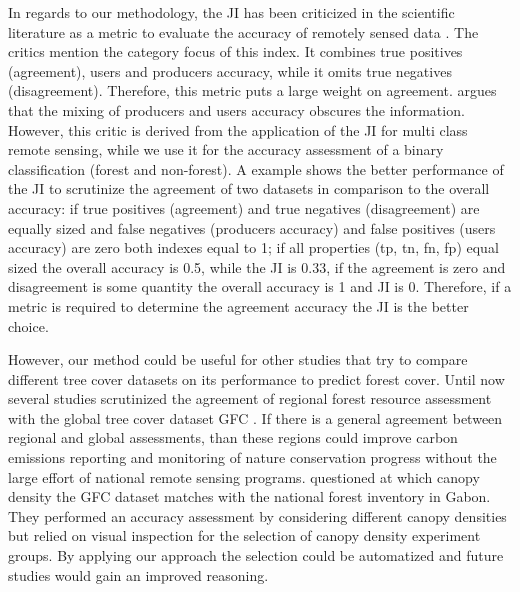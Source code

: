 		In regards to our methodology, the \ac{JI} has been criticized in the scientific literature as a metric to evaluate the accuracy of remotely sensed data \citep{Li2017a}. The critics mention the category focus of this index. It combines true positives (agreement), users and producers accuracy, while it omits true negatives (disagreement). Therefore, this metric puts a large weight on agreement. \citet{Li2017a} argues that the mixing of producers and users accuracy obscures the information. However, this critic is derived from the application of the \ac{JI} for multi class remote sensing, while we use it for the accuracy assessment of a binary classification (forest and non-forest). A example shows the better performance of the \ac{JI} to scrutinize the agreement of two datasets in comparison to the overall accuracy: if true positives (agreement) and true negatives (disagreement) are equally sized and false negatives (producers accuracy) and false positives (users accuracy) are zero both indexes equal to 1; if all properties (tp, tn, fn, fp) equal sized the overall accuracy is 0.5, while the \ac{JI} is 0.33, if the agreement is zero and disagreement is some quantity the overall accuracy is 1 and \ac{JI} is 0. Therefore, if a metric is required to determine the agreement accuracy the \ac{JI} is the better choice. 

		However, our method could be useful for other studies that try to compare different tree cover datasets on its performance to predict forest cover. Until now several studies scrutinized the agreement of regional forest resource assessment with the global tree cover dataset \ac{GFC} \citep{Sannier2016,McRoberts2016,Gross2017}. If there is a general agreement between regional and global assessments, than these regions could improve carbon emissions reporting and monitoring of nature conservation progress without the large effort of national remote sensing programs. \citet{Sannier2016} questioned at which canopy density the \ac{GFC} dataset matches with the national forest inventory in Gabon. They performed an accuracy assessment by considering different canopy densities but relied on visual inspection for the selection of canopy density experiment groups. By applying our approach the selection could be automatized and future studies would gain an improved reasoning.

